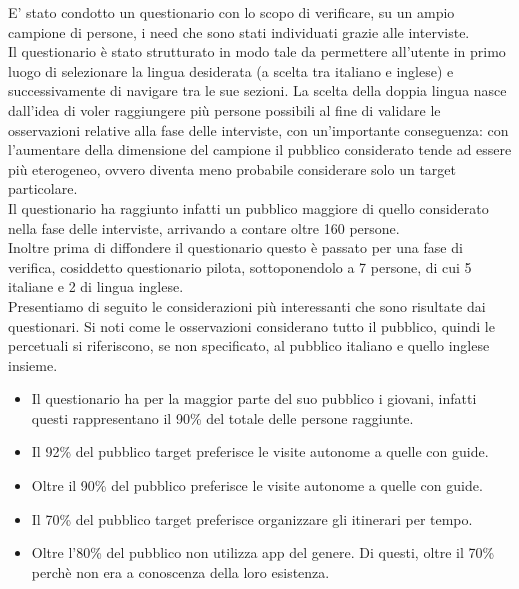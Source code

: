 E' stato condotto un questionario con lo scopo di verificare, su un ampio campione di persone, i need che sono stati individuati grazie alle interviste.\\

Il questionario è stato strutturato in modo tale da permettere all'utente in primo luogo di selezionare la lingua desiderata (a scelta tra italiano e inglese) e successivamente di navigare tra le sue sezioni. La scelta della doppia lingua nasce dall'idea di voler 
raggiungere più persone possibili al fine di validare le osservazioni relative alla fase delle interviste, con un'importante conseguenza: con l'aumentare della dimensione del campione il pubblico considerato tende ad essere più eterogeneo, ovvero diventa meno probabile considerare solo un target particolare. \\

Il questionario ha raggiunto infatti un pubblico maggiore di quello considerato nella fase delle interviste, arrivando a contare oltre 160 persone. \\

Inoltre prima di diffondere il questionario questo è passato per una fase di verifica, cosiddetto questionario pilota, sottoponendolo a 7 persone, di cui 5 italiane e 2 di lingua inglese.\\

Presentiamo di seguito le considerazioni più interessanti che sono risultate dai questionari. Si noti come le osservazioni considerano tutto il pubblico, quindi le percetuali si riferiscono, se non specificato, al pubblico italiano e quello inglese insieme.

\begin{itemize}

\item Il questionario ha per la maggior parte del suo pubblico i giovani, infatti questi rappresentano il 90\% del totale delle persone raggiunte.

\item Il 92\% del pubblico target preferisce le visite autonome a quelle con guide.

\item Oltre il 90\% del pubblico preferisce le visite autonome a quelle con guide.

\item Il 70\% del pubblico target preferisce organizzare gli itinerari per tempo.

\item Oltre l'80\% del pubblico non utilizza app del genere. Di questi, oltre il 70\% perchè non era a conoscenza della loro esistenza.

\end{itemize}
